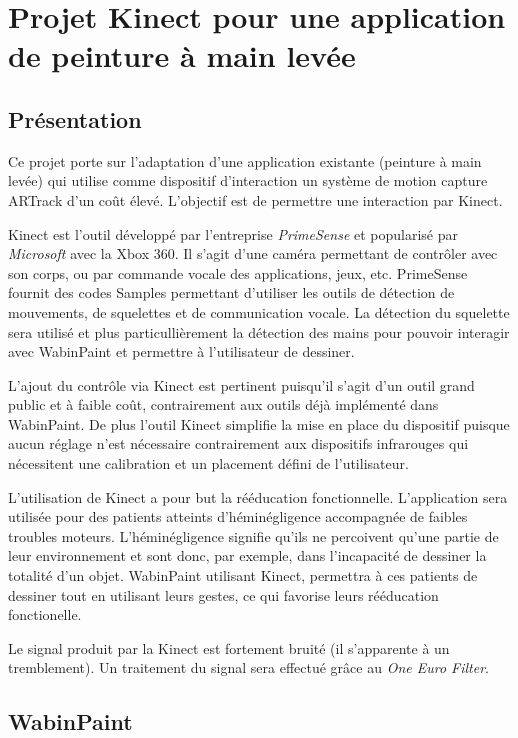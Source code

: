 \chapter{Projet Kinect pour une application de peinture à main levée}


\section{Présentation}

Ce projet porte sur l'adaptation d'une application existante (peinture à main levée) qui utilise comme dispositif d'interaction un système de motion capture ARTrack d'un coût élevé. L'objectif est de permettre une interaction par Kinect.

Kinect est l'outil développé par l'entreprise \textit{PrimeSense} et popularisé par \textit{Microsoft}  avec la Xbox 360. Il s'agit d'une caméra permettant de contrôler avec son corps, ou par commande vocale des applications, jeux, etc. PrimeSense fournit des codes Samples permettant d'utiliser les outils de détection de mouvements, de squelettes et de communication vocale. La détection du squelette sera utilisé et plus particullièrement la détection des mains pour pouvoir interagir avec WabinPaint et permettre à l'utilisateur de dessiner.

L'ajout du contrôle via Kinect est pertinent puisqu'il s'agit d'un outil grand public et à faible coût, contrairement aux outils déjà implémenté dans WabinPaint. De plus l'outil Kinect simplifie la mise en place du dispositif puisque aucun réglage n'est nécessaire contrairement aux dispositifs infrarouges qui nécessitent une calibration et un placement défini de l'utilisateur.

L'utilisation de Kinect a pour but la rééducation fonctionnelle. L'application sera utilisée pour des patients atteints d'héminégligence accompagnée de faibles troubles moteurs. L'héminégligence signifie qu'ils ne percoivent qu'une partie de leur environnement et sont donc, par exemple, dans l'incapacité de dessiner la totalité d'un objet. WabinPaint utilisant Kinect, permettra à ces patients de dessiner tout en utilisant leurs gestes, ce qui favorise leurs rééducation fonctionelle.

Le signal produit par la Kinect est fortement bruité (il s'apparente à un tremblement). Un traitement du signal sera effectué grâce au \textit{One Euro Filter}.

\section{WabinPaint}

